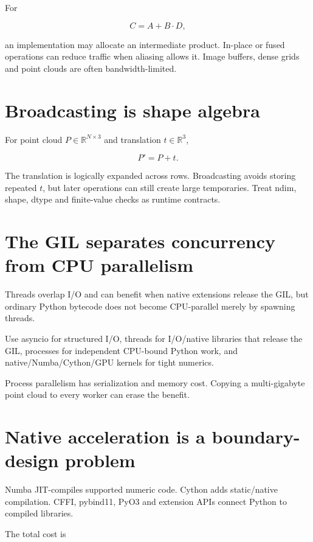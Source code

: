 For

\[
C=A+B\cdot D,
\]

an implementation may allocate an intermediate product. In-place or fused operations can reduce traffic when aliasing allows it. Image buffers, dense grids and point clouds are often bandwidth-limited.

\section{Broadcasting is shape algebra}\label{01-foundations-i-ch017-broadcasting-is-shape-algebra}

For point cloud \(P\in\mathbb R^{N\times3}\) and translation \(t\in\mathbb R^3\),

\[
P'=P+t.
\]

The translation is logically expanded across rows. Broadcasting avoids storing repeated \(t\), but later operations can still create large temporaries. Treat ndim, shape, dtype and finite-value checks as runtime contracts.

\section{The GIL separates concurrency from CPU parallelism}\label{01-foundations-i-ch017-the-gil-separates-concurrency-from-cpu-parallelism}

Threads overlap I/O and can benefit when native extensions release the GIL, but ordinary Python bytecode does not become CPU-parallel merely by spawning threads.

Use asyncio for structured I/O, threads for I/O/native libraries that release the GIL, processes for independent CPU-bound Python work, and native/Numba/Cython/GPU kernels for tight numerics.

Process parallelism has serialization and memory cost. Copying a multi-gigabyte point cloud to every worker can erase the benefit.

\section{Native acceleration is a boundary-design problem}\label{01-foundations-i-ch017-native-acceleration-is-a-boundary-design-problem}

Numba JIT-compiles supported numeric code. Cython adds static/native compilation. CFFI, pybind11, PyO3 and extension APIs connect Python to compiled libraries.

The total cost is

